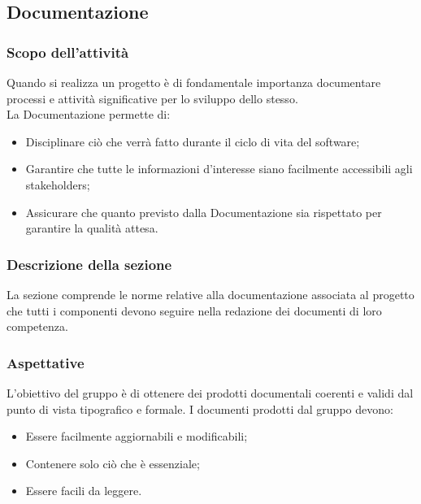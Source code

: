 \subsection{Documentazione}
\subsubsection{Scopo dell'attività} \label{PSup_Documentazione_Scopo}
Quando si realizza un progetto è di fondamentale importanza documentare processi e attività significative per lo sviluppo dello stesso. \\
La Documentazione permette di:
\begin{itemize}
	\item Disciplinare ciò che verrà fatto durante il ciclo di vita del software;
	\item Garantire che tutte le informazioni d'interesse siano facilmente accessibili agli stakeholders;
	\item Assicurare che quanto previsto dalla Documentazione sia rispettato per garantire la qualità attesa.
\end{itemize}

\subsubsection{Descrizione della sezione} 
La sezione comprende le norme relative alla documentazione associata al progetto che tutti i componenti devono seguire nella redazione dei documenti di loro competenza.

\subsubsection{Aspettative}
L'obiettivo del gruppo è di ottenere dei prodotti documentali coerenti e validi dal punto di vista tipografico e formale.
I documenti prodotti dal gruppo devono:
\begin{itemize}
	\item Essere facilmente aggiornabili e modificabili;
	\item Contenere solo ciò che è essenziale;
	\item Essere facili da leggere.
\end{itemize}

